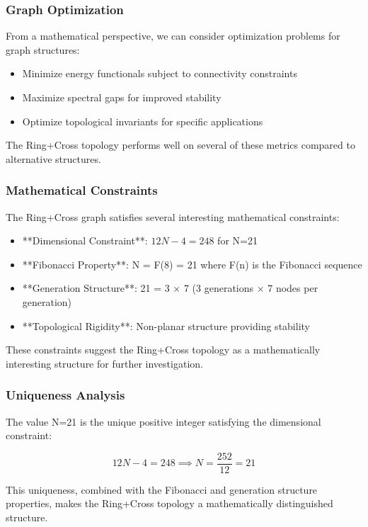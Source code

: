 \documentclass[12pt,a4paper]{article}
\begin{document}
\subsubsection{Graph Optimization}
From a mathematical perspective, we can consider optimization problems for graph structures:

\begin{itemize}
\item Minimize energy functionals subject to connectivity constraints
\item Maximize spectral gaps for improved stability
\item Optimize topological invariants for specific applications
\end{itemize}

The Ring+Cross topology performs well on several of these metrics compared to alternative structures.

\subsubsection{Mathematical Constraints}
The Ring+Cross graph satisfies several interesting mathematical constraints:

\begin{itemize}
\item **Dimensional Constraint**: $12N - 4 = 248$ for N=21
\item **Fibonacci Property**: N = F(8) = 21 where F(n) is the Fibonacci sequence
\item **Generation Structure**: 21 = 3 × 7 (3 generations × 7 nodes per generation)
\item **Topological Rigidity**: Non-planar structure providing stability
\end{itemize}

These constraints suggest the Ring+Cross topology as a mathematically interesting structure for further investigation.

\subsubsection{Uniqueness Analysis}
The value N=21 is the unique positive integer satisfying the dimensional constraint:

\[12N - 4 = 248 \implies N = \frac{252}{12} = 21\]

This uniqueness, combined with the Fibonacci and generation structure properties, makes the Ring+Cross topology a mathematically distinguished structure.
\end{document}
